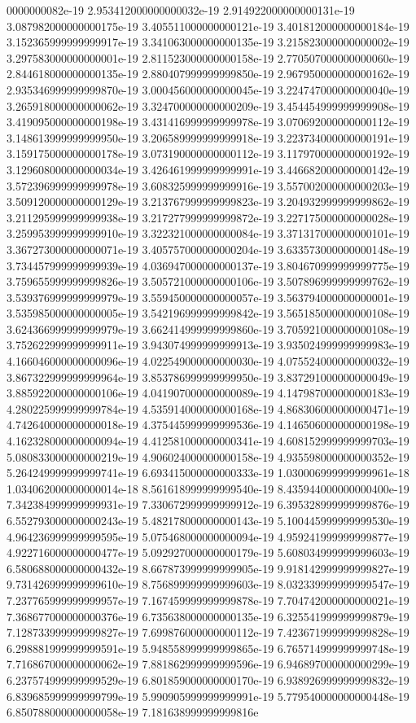 0000000082e-19	2.953412000000000032e-19	2.914922000000000131e-19	3.087982000000000175e-19	3.405511000000000121e-19	3.401812000000000184e-19	3.152365999999999917e-19	3.341063000000000135e-19	3.215823000000000002e-19	3.297583000000000001e-19	2.811523000000000158e-19	2.770507000000000060e-19	2.844618000000000135e-19	2.880407999999999850e-19	2.967950000000000162e-19	2.935346999999999870e-19	3.000456000000000045e-19	3.224747000000000040e-19	3.265918000000000062e-19	3.324700000000000209e-19	3.454454999999999908e-19	3.419095000000000198e-19	3.431416999999999978e-19	3.070692000000000112e-19	3.148613999999999950e-19	3.206589999999999918e-19	3.223734000000000191e-19	3.159175000000000178e-19	3.073190000000000112e-19	3.117970000000000192e-19	3.129608000000000034e-19	3.426461999999999991e-19	3.446682000000000142e-19	3.572396999999999978e-19	3.608325999999999916e-19	3.557002000000000203e-19	3.509120000000000129e-19	3.213767999999999823e-19	3.204932999999999862e-19	3.211295999999999938e-19	3.217277999999999872e-19	3.227175000000000028e-19	3.259953999999999910e-19	3.322321000000000084e-19	3.371317000000000101e-19	3.367273000000000071e-19	3.405757000000000204e-19	3.633573000000000148e-19	3.734457999999999939e-19	4.036947000000000137e-19	3.804670999999999775e-19	3.759655999999999826e-19	3.505721000000000106e-19	3.507896999999999762e-19	3.539376999999999979e-19	3.559450000000000057e-19	3.563794000000000001e-19	3.535985000000000005e-19	3.542196999999999842e-19	3.565185000000000108e-19	3.624366999999999979e-19	3.662414999999999860e-19	3.705921000000000108e-19	3.752622999999999911e-19	3.943074999999999913e-19	3.935024999999999983e-19	4.166046000000000096e-19	4.022549000000000030e-19	4.075524000000000032e-19	3.867322999999999964e-19	3.853786999999999950e-19	3.837291000000000049e-19	3.885922000000000106e-19	4.041907000000000089e-19	4.147987000000000183e-19	4.280225999999999784e-19	4.535914000000000168e-19	4.868306000000000471e-19	4.742640000000000018e-19	4.375445999999999536e-19	4.146506000000000198e-19	4.162328000000000094e-19	4.412581000000000341e-19	4.608152999999999703e-19	5.080833000000000219e-19	4.906024000000000158e-19	4.935598000000000352e-19	5.264249999999999741e-19	6.693415000000000333e-19	1.030006999999999961e-18	1.034062000000000014e-18	8.561618999999999540e-19	8.435944000000000400e-19	7.342384999999999931e-19	7.330672999999999912e-19	6.395328999999999876e-19	6.552793000000000243e-19	5.482178000000000143e-19	5.100445999999999530e-19	4.964236999999999595e-19	5.075468000000000094e-19	4.959241999999999877e-19	4.922716000000000477e-19	5.092927000000000179e-19	5.608034999999999603e-19	6.580688000000000432e-19	8.667873999999999905e-19	9.918142999999999827e-19	9.731426999999999610e-19	8.756899999999999603e-19	8.032339999999999547e-19	7.237765999999999957e-19	7.167459999999999878e-19	7.704742000000000021e-19	7.368677000000000376e-19	6.735638000000000135e-19	6.325541999999999879e-19	7.128733999999999827e-19	7.699876000000000112e-19	7.423671999999999828e-19	6.298881999999999591e-19	5.948558999999999865e-19	6.765714999999999748e-19	7.716867000000000062e-19	7.881862999999999596e-19	6.946897000000000299e-19	6.237574999999999529e-19	6.801859000000000170e-19	6.938926999999999832e-19	6.839685999999999799e-19	5.990905999999999991e-19	5.779540000000000448e-19	6.850788000000000058e-19	7.181638999999999816e